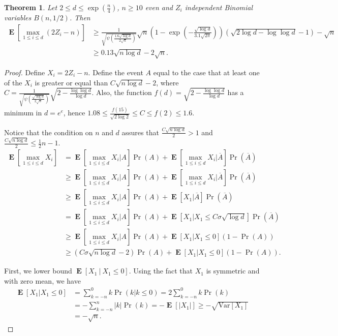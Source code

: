 \documentclass{article}
\DeclareMathOperator*{\Exp}{\mathbf{E}}
\newcommand{\Var}{\mathrm{Var}}
\newtheorem{theorem}{Theorem}
\begin{document}
\begin{theorem}
\label{theorem:max_bin}
Let $2 \le d \le \exp(\frac{n}{4})$, $n\ge 10$ even and $Z_i$ independent Binomial variables $B(n,1/2)$. Then
\begin{align*}
\Exp \left[ \max_{1 \le i \le d} (2 Z_i - n)\right]
& \ge \frac{1}{\sqrt{\psi\left(\frac{1.6\sqrt{\log d}}{2 \sqrt{n}}\right)}}\sqrt{n}\left(1 - \exp\left(-\frac{\sqrt{\log d}}{3.1 \sqrt{2\pi}}\right)\right) \left(\sqrt{2 \log d -\log \log d}-1\right) -\sqrt{n} \\
& \ge 0.13 \sqrt{n \log d} - 2 \sqrt{n}.
\end{align*}
\end{theorem}
%
\begin{proof}
Define $X_i= 2 Z_i-n$.
Define the event $A$ equal to the case that at least one of the $X_i$ is greater or equal than $C \sqrt{n \log d}-2$, where $C=\frac{1}{\sqrt{\psi\left(\frac{\sqrt{\log d}}{2 \sqrt{n}}\right)}}\sqrt{2-\frac{\log \log d}{\log d}}$. Also, the function $f(d)=\sqrt{2-\frac{\log \log d}{\log d}}$ has a minimum in $d=e^e$, hence $1.08 \le \frac{f(15)}{\sqrt{2 \log 2}} \le C\le f(2)\le 1.6$.

Notice that the condition on $n$ and $d$ assures that $\frac{C \sqrt{n \log d}}{2}>1$ and $\frac{C \sqrt{n \log d}}{2}\le \frac{1}{2} n -1$.
%
\begin{align*}
\Exp [\max_{1 \le i \le d} X_i]
& = \Exp [\max_{1 \le i \le d} X_i| A ] \Pr(A) + \Exp [\max_{1 \le i \le d} X_i| \overline{A} ] \Pr(\overline{A}) \\
& \ge \Exp[\max_{1 \le i \le d} X_i| A ] \Pr(A) + \Exp[\max_{1 \le i \le d} X_i| \overline{A} ] \Pr(\overline{A})\\
& \ge \Exp[\max_{1 \le i \le d} X_i| A ] \Pr(A) + \Exp[X_1| \overline{A} ] \Pr(\overline{A} ) \\
& = \Exp[\max_{1 \le i \le d} X_i| A ] \Pr(A) + \Exp[X_1| X_1\le C \sigma \sqrt{\log d}] \Pr(\overline{A})\\
& \ge \Exp[\max_{1 \le i \le d} X_i| A ] \Pr(A) + \Exp[X_1| X_1\le 0](1-\Pr(A)) \\
& \ge (C \sigma \sqrt{n \log d} -2) \Pr(A) + \Exp[X_1| X_1\le 0] (1-\Pr(A)).
\end{align*}

First, we lower bound $\Exp[X_1~|~ X_1 \le 0]$. Using the fact that $X_1$ is symmetric and with zero mean, we have
\begin{align*}
\Exp[X_1| X_1\le 0] &= \sum_{k=-n}^0 k \Pr(k | k\le 0) = 2 \sum_{k=-n}^0 k \Pr(k) \\
& = - \sum_{k=-n}^n |k| \Pr(k) = - \Exp[|X_1|] \ge - \sqrt{\Var[X_1]}\\
& = -\sqrt{n}.
\end{align*}


\end{proof}
\end{document}

